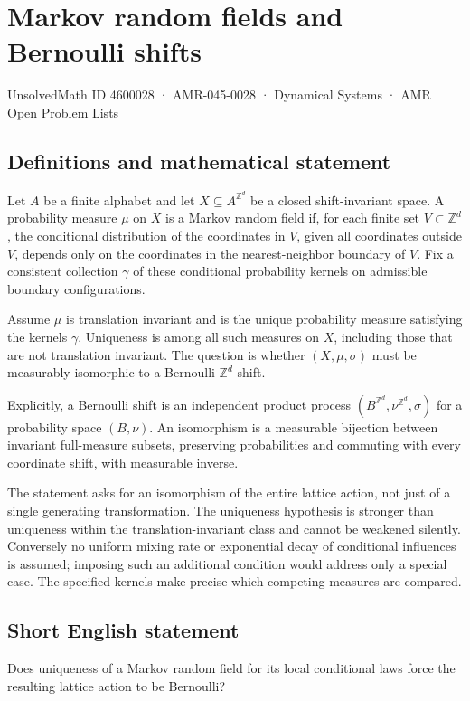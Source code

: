 \documentclass[11pt,a4paper]{article}
\begin{document}
\section*{Markov random fields and Bernoulli shifts}\label{4600028}
{\small UnsolvedMath ID 4600028 · AMR-045-0028 · Dynamical Systems · AMR Open Problem Lists}
\subsection{Definitions and mathematical statement}
Let $A$ be a finite alphabet and let $X\subseteq A^{\mathbb Z^d}$ be a
closed shift-invariant space. A probability measure $\mu$ on $X$ is a
Markov random field if, for each finite set $V\subset\mathbb Z^d$, the
conditional distribution of the coordinates in $V$, given all coordinates
outside $V$, depends only on the coordinates in the nearest-neighbor
boundary of $V$. Fix a consistent collection $\gamma$ of these conditional
probability kernels on admissible boundary configurations.

Assume $\mu$ is translation invariant and is the unique probability
measure satisfying the kernels $\gamma$. Uniqueness is among all such
measures on $X$, including those that are not translation invariant.
The question is whether $(X,\mu,\sigma)$ must be measurably isomorphic
to a Bernoulli $\mathbb Z^d$ shift.

Explicitly, a Bernoulli shift is an independent product process
$(B^{\mathbb Z^d},\nu^{\mathbb Z^d},\sigma)$ for a probability space
$(B,\nu)$. An isomorphism is a measurable bijection between invariant
full-measure subsets, preserving probabilities and commuting with every
coordinate shift, with measurable inverse.

The statement asks for an isomorphism of the entire lattice action,
not just of a single generating transformation. The uniqueness
hypothesis is stronger than uniqueness within the translation-invariant
class and cannot be weakened silently. Conversely no uniform mixing
rate or exponential decay of conditional influences is assumed; imposing
such an additional condition would address only a special case. The
specified kernels make precise which competing measures are compared.
\subsection{Short English statement}
Does uniqueness of a Markov random field for its local conditional laws force the resulting lattice action to be Bernoulli?
\end{document}
